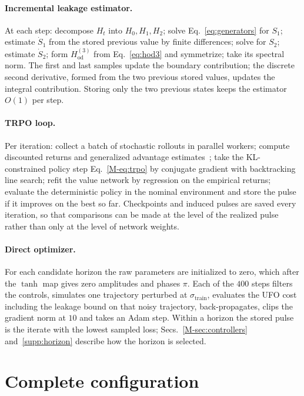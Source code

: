 \documentclass[aps,prx,twocolumn,superscriptaddress,nofootinbib,amsmath,amssymb,floatfix]{revtex4-2}
\newcommand{\strain}{\sigma_{\mathrm{train}}}
\begin{document}
\paragraph*{Incremental leakage estimator.}
At each step: decompose $H_t$ into $H_0,H_1,H_2$; solve Eq.~\eqref{eq:generators} for $S_1$; estimate
$\dot S_1$ from the stored previous value by finite differences; solve for $S_2$; estimate $\dot S_2$;
form $H_{\mathrm{od}}^{(3)}$ from Eq.~\eqref{eq:hod3} and symmetrize; take its spectral norm. The first
and last samples update the boundary contribution; the discrete second derivative, formed from the two
previous stored values, updates the integral contribution. Storing only the two previous states keeps
the estimator $O(1)$ per step.

\paragraph*{TRPO loop.}
Per iteration: collect a batch of stochastic rollouts in parallel workers; compute discounted returns
and generalized advantage estimates~\cite{Schulman2016GAE}; take the KL-constrained policy step
Eq.~\eqref{M-eq:trpo} by conjugate gradient with backtracking line search; refit the value network by
regression on the empirical returns; evaluate the deterministic policy in the nominal environment and
store the pulse if it improves on the best so far. Checkpoints and induced pulses are
saved every iteration, so that comparisons can be made at the level of the realized pulse rather than
only at the level of network weights.

\paragraph*{Direct optimizer.}
For each candidate horizon the raw parameters are initialized to zero, which after the $\tanh$ map gives
zero amplitudes and phases $\pi$. Each of the $400$ steps filters the controls, simulates one trajectory
perturbed at $\strain$, evaluates the UFO cost including the leakage bound on that noisy trajectory,
back-propagates, clips the gradient norm at $10$ and takes an Adam step. Within a horizon the stored pulse
is the iterate with the lowest sampled loss; Secs.~\ref{M-sec:controllers} and~\ref{supp:horizon} describe
how the horizon is selected.

\section{Complete configuration}
\label{app:config}
\end{document}
